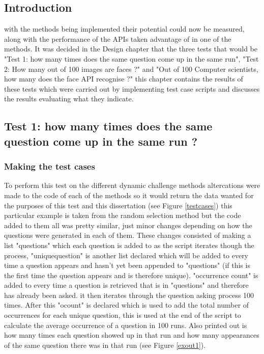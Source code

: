 \documentclass[12pt,a4paper]{article}
\begin{document}
\subsection{Introduction}
with the methods being implemented their potential could now be measured, along with the performance of the APIs taken advantage of in one of the methods. It was decided in the Design chapter that the three tests that would be "Test 1: how many times does the same question come up in the same run", "Test 2: How many out of 100 images are faces ?" and "Out of 100 Computer scientists, how many does the face API recognise ?" this chapter contains the results of these tests which were carried out by implementing test case scripts and discusses the results evaluating what they indicate.  

\subsection{Test 1: how many times does the same question come up in the same run ?}  
\subsubsection{Making the test cases} 
To perform this test on the different dynamic challenge methods altercations were made to the code of each of the methods so it would return the data wanted for the purposes of this test and this dissertation (see Figure \ref{testcases}) this particular example is taken from the random selection method but the code added to them all was pretty similar, just minor changes depending on how the questions were generated in each of them. These changes consisted of making a list "questions" which each question is added to as the script iterates though the process, "unique\textunderscore question" is another list declared which will be added to every time a question appears and hasn't yet been appended to "questions" (if this is the first time the question appears and is therefore unique). "occurrence \textunderscore count" is added to every time a question is retrieved that is in "questions" and therefore has already been asked. it then iterates through the question asking process 100 times. After this "ocount" is declared which is used to add the total number of occurrences for each unique question, this is used at the end of the script to calculate the average occurrence of a question in 100 runs. Also printed out is how many times each question showed up in that run and how many appearances of the same question there was in that run (see Figure \ref{exout1}).
\end{document}
